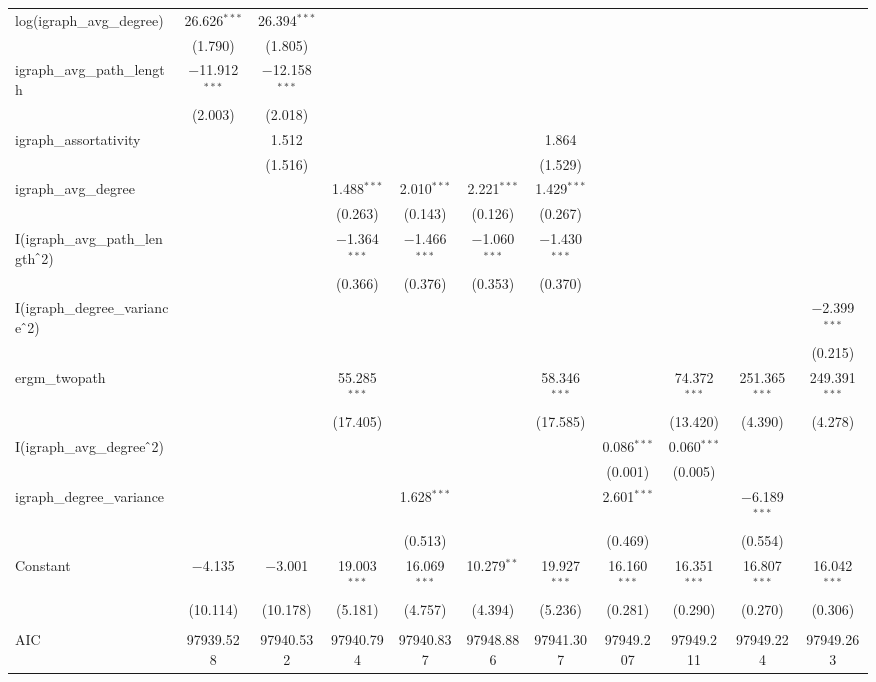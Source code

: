 \begin{table}[!htbp]
\begin{tabular}{@{\extracolsep{5pt}}lcccccccccc}
  log(igraph\_avg\_degree) & 26.626$^{***}$ & 26.394$^{***}$ &  &  &  &  &  &  &  &  \\ 
  & (1.790) & (1.805) &  &  &  &  &  &  &  &  \\ 
  igraph\_avg\_path\_length & $-$11.912$^{***}$ & $-$12.158$^{***}$ &  &  &  &  &  &  &  &  \\ 
  & (2.003) & (2.018) &  &  &  &  &  &  &  &  \\ 
  igraph\_assortativity &  & 1.512 &  &  &  & 1.864 &  &  &  &  \\ 
  &  & (1.516) &  &  &  & (1.529) &  &  &  &  \\ 
  igraph\_avg\_degree &  &  & 1.488$^{***}$ & 2.010$^{***}$ & 2.221$^{***}$ & 1.429$^{***}$ &  &  &  &  \\ 
  &  &  & (0.263) & (0.143) & (0.126) & (0.267) &  &  &  &  \\ 
  I(igraph\_avg\_path\_length$\hat{\mkern6mu}$2) &  &  & $-$1.364$^{***}$ & $-$1.466$^{***}$ & $-$1.060$^{***}$ & $-$1.430$^{***}$ &  &  &  &  \\ 
  &  &  & (0.366) & (0.376) & (0.353) & (0.370) &  &  &  &  \\ 
  I(igraph\_degree\_variance$\hat{\mkern6mu}$2) &  &  &  &  &  &  &  &  &  & $-$2.399$^{***}$ \\ 
  &  &  &  &  &  &  &  &  &  & (0.215) \\ 
  ergm\_twopath &  &  & 55.285$^{***}$ &  &  & 58.346$^{***}$ &  & 74.372$^{***}$ & 251.365$^{***}$ & 249.391$^{***}$ \\ 
  &  &  & (17.405) &  &  & (17.585) &  & (13.420) & (4.390) & (4.278) \\ 
  I(igraph\_avg\_degree$\hat{\mkern6mu}$2) &  &  &  &  &  &  & 0.086$^{***}$ & 0.060$^{***}$ &  &  \\ 
  &  &  &  &  &  &  & (0.001) & (0.005) &  &  \\ 
  igraph\_degree\_variance &  &  &  & 1.628$^{***}$ &  &  & 2.601$^{***}$ &  & $-$6.189$^{***}$ &  \\ 
  &  &  &  & (0.513) &  &  & (0.469) &  & (0.554) &  \\ 
  Constant & $-$4.135 & $-$3.001 & 19.003$^{***}$ & 16.069$^{***}$ & 10.279$^{**}$ & 19.927$^{***}$ & 16.160$^{***}$ & 16.351$^{***}$ & 16.807$^{***}$ & 16.042$^{***}$ \\ 
  & (10.114) & (10.178) & (5.181) & (4.757) & (4.394) & (5.236) & (0.281) & (0.290) & (0.270) & (0.306) \\ 
 \hline \\[-1.8ex] 
AIC & 97939.528 & 97940.532 & 97940.794 & 97940.837 & 97948.886 & 97941.307 & 97949.207 & 97949.211 & 97949.224 & 97949.263 \\ 

\end{tabular}
\end{table}
